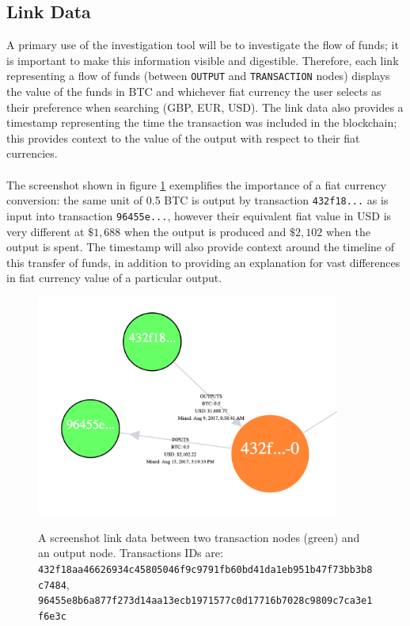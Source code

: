 \subsection{Link Data}
A primary use of the investigation tool will be to investigate the flow of funds; it is important to make this information visible and digestible. Therefore, each link representing a flow of funds (between \texttt{OUTPUT} and \texttt{TRANSACTION} nodes) displays the value of the funds in BTC and whichever fiat currency the user selects as their preference when searching (GBP, EUR, USD). The link data also provides a timestamp representing the time the transaction was included in the blockchain; this provides context to the value of the output with respect to their fiat currencies. 
\\\\
The screenshot shown in figure \ref{fig:link-data} exemplifies the importance of a fiat currency conversion: the same unit of 0.5 BTC is output by transaction \texttt{432f18...} as is input into transaction \texttt{96455e...}, however their equivalent fiat value in USD is very different at $\$1,688$ when the output is produced and $\$2,102$ when the output is spent. The timestamp will also provide context around the timeline of this transfer of funds, in addition to providing an explanation for vast differences in fiat currency value of a particular output.

\begin{figure}[h!]
  \centering
  \includegraphics[width = 10cm]{./figures/ui-screenshots/link-data}\\[0.5cm] 
  \caption{A screenshot link data between two transaction nodes (green) and an output node. 
  Transactions IDs are: \texttt{432f18aa46626934c45805046f9c9791fb60bd41da1eb951b47f73bb3b8c7484},\\\texttt{96455e8b6a877f273d14aa13ecb1971577c0d17716b7028c9809c7ca3e1f6e3c}}
  \label{fig:link-data}
\end{figure}

